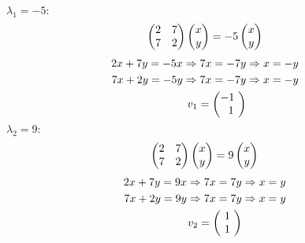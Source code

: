 \documentclass[12pt]{amsart}
\begin{document}
\begin{enumerate}
\begin{enumerate}
			$\lambda_1=-5:$
			\begin{align}
				\begin{pmatrix}
					2 &7 \\
					7 &2
				\end{pmatrix}
				\begin{pmatrix}
					x \\
					y
				\end{pmatrix}=-5
				\begin{pmatrix}
					x \\
					y
				\end{pmatrix} \notag
				\end{align}
				\begin{align}
				2x+7y=-5x \Rightarrow 7x=-7y &\Rightarrow x=-y \notag \\
				7x+2y=-5y \Rightarrow 7x=-7y &\Rightarrow x=-y \notag \\
				v_1= 
					\begin{pmatrix}
						-1 \text{ } \\
						\text{ } \text{ }1 \text{ }
					\end{pmatrix} \notag
			\end{align} 
			$\lambda_2=9:$
			\begin{align}
				\begin{pmatrix}
					2 &7 \\
					7 &2
				\end{pmatrix}
				\begin{pmatrix}
					x \\
					y
				\end{pmatrix}=9
				\begin{pmatrix}
					x \\
					y
				\end{pmatrix} \notag
				\end{align}
				\begin{align}
				2x+7y=9x \Rightarrow 7x=7y &\Rightarrow x=y  \notag \\
				7x+2y=9y \Rightarrow 7x=7y &\Rightarrow x=y  \notag \\
				v_2=
				\begin{pmatrix}
						\text{ }1 \text{ } \\
						\text{ }1 \text{ }
					\end{pmatrix} \notag
			\end{align} 
			

\end{enumerate}
\end{enumerate}
\end{document}
